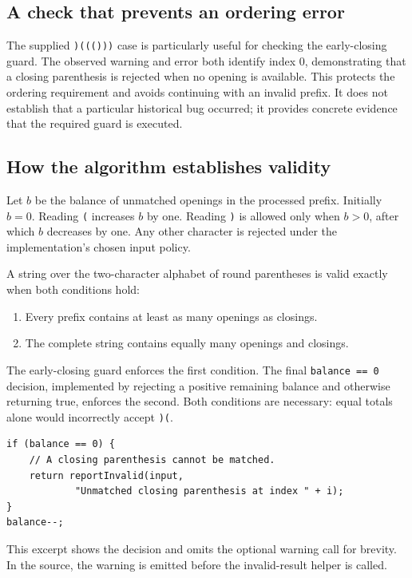 \documentclass[12pt,a4paper]{article}
\newcommand{\code}[1]{\texttt{#1}}
\begin{document}
\subsection{A check that prevents an ordering error}
The supplied \code{)((()))} case is particularly useful for checking the early-closing guard. The observed warning and error both identify index 0, demonstrating that a closing parenthesis is rejected when no opening is available. This protects the ordering requirement and avoids continuing with an invalid prefix. It does not establish that a particular historical bug occurred; it provides concrete evidence that the required guard is executed.

\subsection{How the algorithm establishes validity}
Let $b$ be the balance of unmatched openings in the processed prefix. Initially $b=0$. Reading \code{(} increases $b$ by one. Reading \code{)} is allowed only when $b>0$, after which $b$ decreases by one. Any other character is rejected under the implementation's chosen input policy.

A string over the two-character alphabet of round parentheses is valid exactly when both conditions hold:
\begin{enumerate}
\item Every prefix contains at least as many openings as closings.
\item The complete string contains equally many openings and closings.
\end{enumerate}
The early-closing guard enforces the first condition. The final \code{balance == 0} decision, implemented by rejecting a positive remaining balance and otherwise returning true, enforces the second. Both conditions are necessary: equal totals alone would incorrectly accept \code{)(}.

\begin{samepage}
\begin{lstlisting}
if (balance == 0) {
    // A closing parenthesis cannot be matched.
    return reportInvalid(input,
            "Unmatched closing parenthesis at index " + i);
}
balance--;
\end{lstlisting}
\end{samepage}
This excerpt shows the decision and omits the optional warning call for brevity. In the source, the warning is emitted before the invalid-result helper is called.
\end{document}
